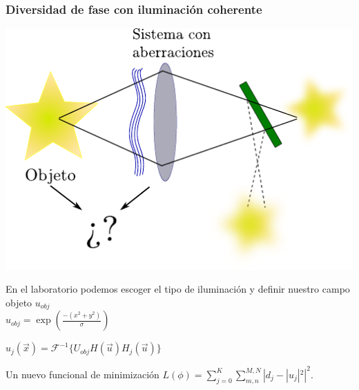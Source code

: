 \documentclass[serif,8pt]{beamer}
\begin{document}
		\begin{frame}
		\frametitle{Diversidad de fase con iluminación coherente}
		
		\vspace*{20pt}
		
		\begin{multicols}{2}

		\includegraphics[scale=0.65]{img/objetopd.pdf}

		\newpage
		\centering
		En el laboratorio podemos escoger el tipo de iluminación y definir nuestro campo objeto $u_{obj}$\\
		\vspace*{15pt}
		$ u_{obj} = \exp \left( \frac{-(x^2+y^2)}{\sigma} \right) $\vspace*{30pt}
		
		$u_j(\vec{x}) = \mathscr{F}^{-1} \{ U_{obj}H(\vec{u}) H_j(\vec{u})\} $
		\end{multicols}
		\vspace*{30pt}
		\begin{block}{\centering Un nuevo funcional de minimización}
			\centering
			$L(\phi) = \sum\limits_{j=0}^K \sum\limits_{m,n}^{M,N} |d_j - |u_j|^2|^2.$
			\end{block}
			
		\end{frame}
		
\end{document}
